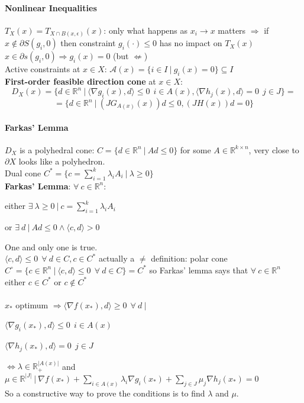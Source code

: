 \documentclass[10pt]{report}
\begin{document}
\paragraph{Nonlinear Inequalities} $T_X(x) = T_{X\cap B(x,\epsilon)}(x)$: only what happens as $x_i\rightarrow x$ matters $\Rightarrow$ if $x\not\in \partial S(g_i,0)$ then constraint $g_i(\cdot)\leq 0$ has no impact on $T_X(x)$\\
$x\in\partial s(g_i,0)\Rightarrow g_i(x)=0$ (but $\not\Leftarrow$)\\
Active constraints at $x\in X$: $\mathscr{A}(x) = \{i\in I\:|\:g_i(x)=0\}\subseteq I$\\
\textbf{First-order feasible direction cone} at $x\in X$: $$D_X(x) = \{d\in \mathbb{R}^n\:|\:\langle\nabla g_i(x), d\rangle\leq 0\:\:i\in A(x),\langle\nabla h_j(x),d\rangle = 0\:\:j\in J\}=$$ $$=\{d\in \mathbb{R}^n\:|\:(JG_{A(x)}(x))d\leq 0, (JH(x))d=0\}$$
\paragraph{Farkas' Lemma} $D_X$ is a polyhedral cone: $C=\{d\in \mathbb{R}^n\:|\:Ad\leq 0\}$ for some $A\in \mathbb{R}^{k\times n}$, very close to $\partial X$ looks like a polyhedron.\\
Dual cone $C^*=\{c=\sum_{i=1}^k\lambda_iA_i\:|\:\lambda \geq 0\}$\\
\textbf{Farkas' Lemma}: $\forall\:c\in \mathbb{R}^n$:
\begin{list}{}{}
	\item either $\exists\:\lambda\geq 0\:|\:c = \sum_{i=1}^k \lambda_iA_i$
	\item or $\exists\:d\:|\:Ad\leq 0\wedge\langle c,d\rangle > 0$
\end{list}
One and only one is true.\\
$\langle c,d\rangle \leq 0\:\:\forall\:d\in C, c\in C^*$ actually a $\neq$ definition: polar cone $C^\circ=\{c\in \mathbb{R}^n\:|\:\langle c,d\rangle\leq 0\:\:\forall\:d\in C\}=C^*$ so Farkas' lemma says that $\forall\:c\in \mathbb{R}^n$ either $c\in C^*$ or $c\not\in C^*$\\\\
$x_*$ optimum $\Rightarrow \langle\nabla f(x_*),d\rangle\geq 0\:\:\forall\:d\:|\:$
\begin{list}{}{}
	\item $\langle\nabla g_i(x_*),d\rangle\leq 0\:\:i\in A(x)$
	\item $\langle\nabla h_j(x_*),d\rangle = 0\:\:j\in J$
\end{list}
$\Leftrightarrow\lambda\in \mathbb{R}_+^{|A(x)|}$ and $\mu \in \mathbb{R}^{|J|}\:|\:\nabla f(x_*) + \sum_{i\in A(x)}\lambda_i\nabla g_i(x_*) + \sum_{j\in J} \mu_j\nabla h_j(x_*)=0$\\
So a constructive way to prove the conditions is to find $\lambda$ and $\mu$.
\end{document}
